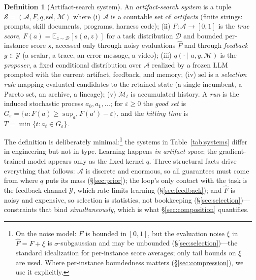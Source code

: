 \documentclass{article}
\theoremstyle{plain}
\theoremstyle{definition}
\newtheorem{definition}[theorem]{Definition}
\theoremstyle{remark}
\newcommand{\A}{\mathcal{A}}
\newcommand{\Y}{\mathcal{Y}}
\newcommand{\D}{\mathcal{D}}
\newcommand{\M}{\mathcal{M}}
\newcommand{\E}{\mathbb{E}}
\newcommand{\sel}{\mathrm{sel}}
\newcommand{\Fhat}{\widehat{F}}
\newcommand{\eps}{\varepsilon}
\begin{document}
\begin{definition}[Artifact-search system]
\label{def:as}
An \emph{artifact-search system} is a tuple $\mathcal{S} = (\A, F, q, \sel, \M)$ where
(i) $\A$ is a countable set of \emph{artifacts} (finite strings: prompts, skill documents, programs, harness code);
(ii) $F : \A \to [0,1]$ is the \emph{true score}, $F(a) = \E_{z \sim \D}[s(a, z)]$ for a task distribution $\D$ and bounded per-instance score $s$, accessed only through noisy evaluations $\Fhat$ and through \emph{feedback} $y \in \Y$ (a scalar, a trace, an error message, a video);
(iii) $q(\cdot \mid a, y, \M)$ is the \emph{proposer}, a fixed conditional distribution over $\A$ realized by a frozen LLM prompted with the current artifact, feedback, and memory;
(iv) $\sel$ is a \emph{selection rule} mapping evaluated candidates to the retained state (a single incumbent, a Pareto set, an archive, a lineage);
(v) $\M_t$ is accumulated history.
A \emph{run} is the induced stochastic process $a_0, a_1, \ldots$; for $\eps \ge 0$ the \emph{good set} is $G_\eps = \{a : F(a) \ge \sup_{a'} F(a') - \eps\}$, and the \emph{hitting time} is $T = \min\{t : a_t \in G_\eps\}$.
\end{definition}

The definition is deliberately minimal:\footnote{On the noise model: $F$ is bounded in $[0,1]$, but the evaluation noise $\xi$ in $\Fhat = F + \xi$ is $\sigma$-subgaussian and may be unbounded (\S\ref{sec:selection})---the standard idealization for per-instance score averages; only tail bounds on $\xi$ are used. Where per-instance boundedness matters (\S\ref{sec:compression}), we use it explicitly.\label{fn:noise}} the systems in Table~\ref{tab:systems} differ in engineering but not in type. Learning happens \emph{in artifact space}; the gradient-trained model appears only as the fixed kernel $q$. Three structural facts drive everything that follows: $\A$ is discrete and enormous, so all guarantees must come from where $q$ puts its mass (\S\ref{sec:prior}); the loop's only contact with the task is the feedback channel $\Y$, which rate-limits learning (\S\ref{sec:feedback}); and $\Fhat$ is noisy and expensive, so selection is statistics, not bookkeeping (\S\ref{sec:selection})---constraints that bind \emph{simultaneously}, which is what \S\ref{sec:composition} quantifies.
\end{document}
